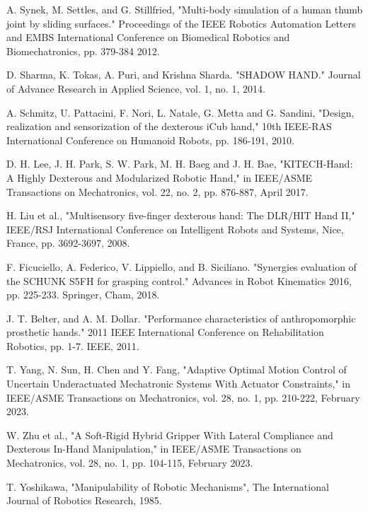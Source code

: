 \documentclass[journal]{IEEEtran}
\begin{document}
\begin{thebibliography}{1}
 A. Synek, M. Settles, and G. Stillfried, "Multi-body simulation of a human thumb joint by sliding surfaces." Proceedings of the IEEE Robotics Automation Letters and EMBS International Conference on Biomedical Robotics and Biomechatronics, pp. 379-384 2012.

 D. Sharma, K. Tokas, A. Puri, and Krishna Sharda. "SHADOW HAND." Journal of Advance Research in Applied Science, vol. 1, no. 1, 2014.

 A. Schmitz, U. Pattacini, F. Nori, L. Natale, G. Metta and G. Sandini, "Design, realization and sensorization of the dexterous iCub hand," 10th IEEE-RAS International Conference on Humanoid Robots, pp. 186-191, 2010.

 D. H. Lee, J. H. Park, S. W. Park, M. H. Baeg and J. H. Bae, "KITECH-Hand: A Highly Dexterous and Modularized Robotic Hand," in IEEE/ASME Transactions on Mechatronics, vol. 22, no. 2, pp. 876-887, April 2017.

 H. Liu et al., "Multisensory five-finger dexterous hand: The DLR/HIT Hand II," IEEE/RSJ International Conference on Intelligent Robots and Systems, Nice, France, pp. 3692-3697, 2008.

 F. Ficuciello, A. Federico, V. Lippiello, and B. Siciliano. "Synergies evaluation of the SCHUNK S5FH for grasping control." Advances in Robot Kinematics 2016, pp. 225-233. Springer, Cham, 2018.

 J. T. Belter, and A. M. Dollar. "Performance characteristics of anthropomorphic prosthetic hands." 2011 IEEE International Conference on Rehabilitation Robotics, pp. 1-7. IEEE, 2011.

 T. Yang, N. Sun, H. Chen and Y. Fang, "Adaptive Optimal Motion Control of Uncertain Underactuated Mechatronic Systems With Actuator Constraints," in IEEE/ASME Transactions on Mechatronics, vol. 28, no. 1, pp. 210-222, February 2023.

 W. Zhu et al., "A Soft-Rigid Hybrid Gripper With Lateral Compliance and Dexterous In-Hand Manipulation," in IEEE/ASME Transactions on Mechatronics, vol. 28, no. 1, pp. 104-115, February 2023.

 T. Yoshikawa, "Manipulability of Robotic Mechanisms", The International Journal of Robotics Research, 1985.


\end{thebibliography}
\end{document}
